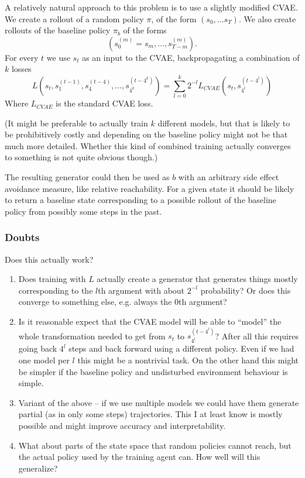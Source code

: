 \documentclass{article}
\newcommand{\baseline}{b}
\begin{document}
		A relatively natural approach to this problem is to use a slightly modified CVAE.
		We create a rollout of a random policy $\pi$, of the form $\left( s_0, \dots s_T \right)$.
		We also create rollouts of the baseline policy $\pi_b$ of the forms
		\begin{equation*}
			\left( s^{\left( m \right)}_0 = s_m, \dots, s^{\left( m \right)}_{T-m} \right).
		\end{equation*}
		For every $t$ we use $s_t$ as an input to the CVAE, backpropagating a combination of
		$k$ losses
		\begin{equation*}
			L(s_t, s^{\left( t-1 \right)}_{1}, s^{\left( t-4 \right)}_4, \dots, s^{\left( t-4^k \right)}_{4^k}) = \sum_{l = 0}^k 2^{-l}L_{CVAE}\left( s_t, s^{\left( t-4^l \right)}_{4^l} \right)
		\end{equation*}
		Where $L_{CVAE}$ is the standard CVAE loss.

		(It might be preferable to actually train $k$ different models, but that is likely to
		be prohibitively costly and depending on the baseline policy might not be that much more detailed.
	 Whether this kind of combined training actually converges to something is not quite obvious though.)

		The resulting generator could then be used as $\baseline$ with an arbitrary side effect avoidance
		measure, like relative reachability. For a given state it should be likely to return
		a baseline state corresponding to a possible rollout of the baseline policy from possibly some
		steps in the past.

		\subsubsection{Doubts}
		 Does this actually work?
			\begin{enumerate}
				\item Does training with $L$ actually create a generator that
					generates things mostly corresponding to the $l$th argument with about $2^{-l}$
					probability? Or does this converge to something else, e.g. always the $0$th argument?
				\item Is it reasonable expect that the CVAE model will be able to ``model'' the whole
					transformation needed to get from $s_t$ to $s^{\left( t-4^l \right)}_{4^l}$?
					After all this requires going back $4^l$ steps and back forward using a different policy.
					Even if we had one model per $l$ this might be a nontrivial task. On the other hand this might
					be simpler if the baseline policy and undisturbed environment behaviour is simple.
				\item Variant of the above -- if we use multiple models we could have them generate
					partial (as in only some steps) trajectories. This I at least know is mostly possible
					and might improve accuracy and interpretability.
				\item What about parts of the state space that random policies cannot reach, but the
					actual policy used by the training agent can. How well will this generalize?
			\end{enumerate}
\end{document}
